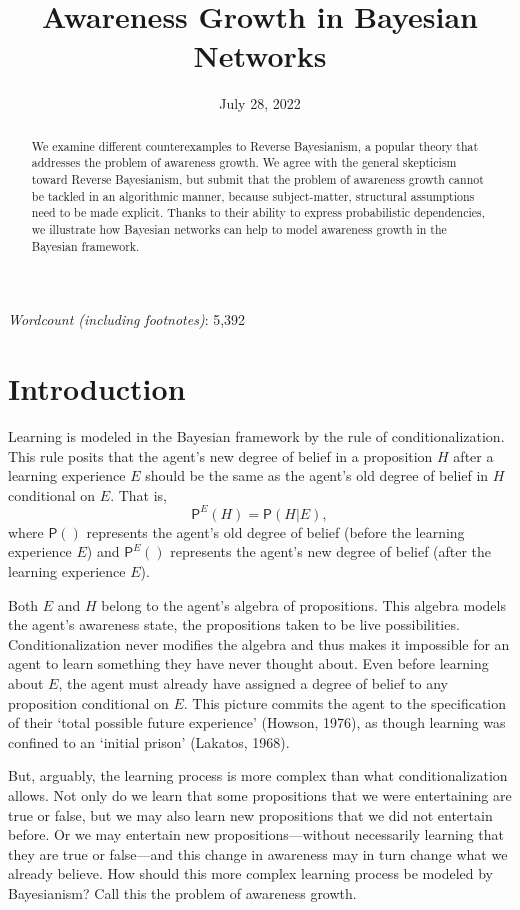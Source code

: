 \documentclass[
  11pt,
  dvipsnames,enabledeprecatedfontcommands]{scrartcl}
\title{Awareness Growth in Bayesian Networks}
\author{}
\date{\vspace{-2.5em}July 28, 2022}
\newcommand{\pr}[1]{\ensuremath{\mathsf{P}(#1)}}
\newcommand{\ppr}[2]{\ensuremath{\mathsf{P}^{#1}(#2)}}
\begin{document}
\maketitle

\doublespace

\emph{Wordcount (including footnotes)}: 5,392

\begin{abstract}
We examine different counterexamples to Reverse Bayesianism, a popular theory 
that addresses the problem of awareness growth. We agree with the general skepticism toward Reverse Bayesianism, but submit that the problem of awareness growth cannot be tackled in an algorithmic manner, because subject-matter, structural assumptions need to be made explicit. Thanks to their ability to express probabilistic dependencies, we illustrate how Bayesian networks can help to model awareness growth in the Bayesian framework. 
\end{abstract}

\doublespace
\linenumbers

\hypertarget{introduction}{%
\section{Introduction}\label{introduction}}

Learning is modeled in the Bayesian framework by the rule of
conditionalization. This rule posits that the agent's new degree of
belief in a proposition \(H\) after a learning experience \(E\) should
be the same as the agent's old degree of belief in \(H\) conditional on
\(E\). That is, \[\ppr{E}{H}=\pr{H \vert E},\] where \(\pr{}\)
represents the agent's old degree of belief (before the learning
experience \(E\)) and \(\ppr{E}{}\) represents the agent's new degree of
belief (after the learning experience \(E\)).

Both \(E\) and \(H\) belong to the agent's algebra of propositions. This
algebra models the agent's awareness state, the propositions taken to be
live possibilities. Conditionalization never modifies the algebra and
thus makes it impossible for an agent to learn something they have never
thought about. Even before learning about \(E\), the agent must already
have assigned a degree of belief to any proposition conditional on
\(E\). This picture commits the agent to the specification of their
`total possible future experience' (Howson, 1976), as though learning
was confined to an `initial prison' (Lakatos, 1968).

But, arguably, the learning process is more complex than what
conditionalization allows. Not only do we learn that some propositions
that we were entertaining are true or false, but we may also learn new
propositions that we did not entertain before. Or we may entertain new
propositions---without necessarily learning that they are true or
false---and this change in awareness may in turn change what we already
believe. How should this more complex learning process be modeled by
Bayesianism? Call this the problem of awareness growth.
\end{document}
